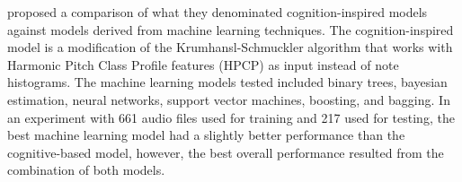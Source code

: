 \textcite{gomez2004estimating} proposed a comparison of what
they denominated cognition-inspired models against models
derived from machine learning techniques. The
cognition-inspired model is a modification of the
Krumhansl-Schmuckler algorithm that works with Harmonic
Pitch Class Profile features (HPCP) as input instead of note
histograms. The machine learning models tested included
binary trees, bayesian estimation, neural networks, support
vector machines, boosting, and bagging. In an experiment
with 661 audio files used for training and 217 used for
testing, the best machine learning model had a slightly
better performance than the cognitive-based model, however,
the best overall performance resulted from the combination
of both models.




